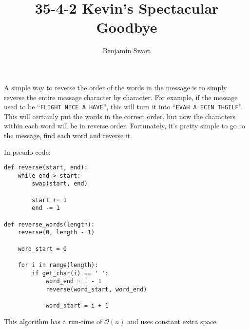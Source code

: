 \documentclass{article}
\title{35-4-2 Kevin's Spectacular Goodbye}
\author{Benjamin Swart}
\begin{document}
\maketitle

A simple way to reverse the order of the words in the message is to simply reverse the entire message character by character. For example, if the message used to be \enquote{\texttt{FLIGHT NICE A HAVE}}, this will turn it into \enquote{\texttt{EVAH A ECIN THGILF}}. This will certainly put the words in the correct order, but now the characters within each word will be in reverse order. Fortunately, it's pretty simple to go to the message, find each word and reverse it.

In pseudo-code:

\begin{verbatim}
def reverse(start, end):
    while end > start:
        swap(start, end)

        start += 1
        end -= 1

def reverse_words(length):
    reverse(0, length - 1)

    word_start = 0

    for i in range(length):
        if get_char(i) == ' ':
            word_end = i - 1
            reverse(word_start, word_end)

            word_start = i + 1
\end{verbatim}

This algorithm has a run-time of $\mathcal{O}(n)$ and uses constant extra space.
\end{document}
